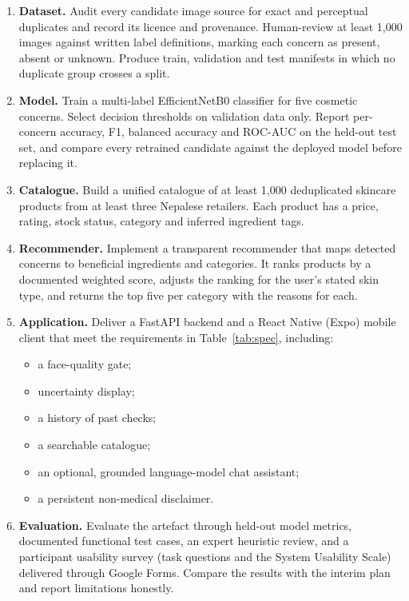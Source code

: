 \begin{enumerate}[label=\textbf{O\arabic*:},leftmargin=30bp]
  \item \textbf{Dataset.} Audit every candidate image source for exact and perceptual duplicates and record its licence and provenance. Human-review at least 1,000 images against written label definitions, marking each concern as present, absent or unknown. Produce train, validation and test manifests in which no duplicate group crosses a split.
  \item \textbf{Model.} Train a multi-label EfficientNetB0 classifier for five cosmetic concerns. Select decision thresholds on validation data only. Report per-concern accuracy, F1, balanced accuracy and ROC-AUC on the held-out test set, and compare every retrained candidate against the deployed model before replacing it.
  \item \textbf{Catalogue.} Build a unified catalogue of at least 1,000 deduplicated skincare products from at least three Nepalese retailers. Each product has a price, rating, stock status, category and inferred ingredient tags.
  \item \textbf{Recommender.} Implement a transparent recommender that maps detected concerns to beneficial ingredients and categories. It ranks products by a documented weighted score, adjusts the ranking for the user's stated skin type, and returns the top five per category with the reasons for each.
  \item \textbf{Application.} Deliver a FastAPI backend and a React Native (Expo) mobile client that meet the requirements in Table~\ref{tab:spec}, including:
  \begin{itemize}
    \item a face-quality gate;
    \item uncertainty display;
    \item a history of past checks;
    \item a searchable catalogue;
    \item an optional, grounded language-model chat assistant;
    \item a persistent non-medical disclaimer.
  \end{itemize}
  \item \textbf{Evaluation.} Evaluate the artefact through held-out model metrics, documented functional test cases, an expert heuristic review, and a participant usability survey (task questions and the System Usability Scale) delivered through Google Forms. Compare the results with the interim plan and report limitations honestly.
\end{enumerate}

